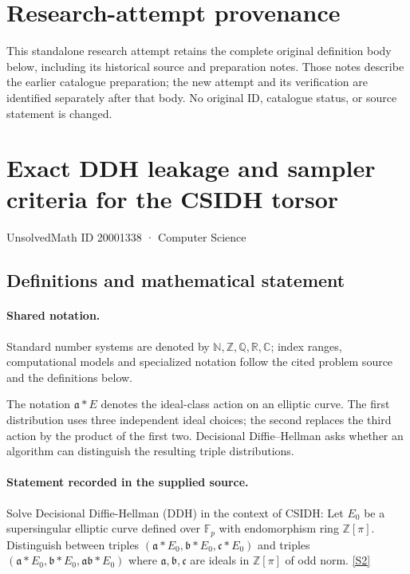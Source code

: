 \documentclass[11pt]{article}
\begin{document}
\section*{Research-attempt provenance}
This standalone research attempt retains the complete original definition body below,
including its historical source and preparation notes. Those notes describe the
earlier catalogue preparation; the new attempt and its verification are identified
separately after that body. No original ID, catalogue status, or source statement is changed.

\section{Exact DDH leakage and sampler criteria for the CSIDH torsor}\label{20001338}
{\small UnsolvedMath ID 20001338 · Computer Science}
\subsection{Definitions and mathematical statement}

\paragraph{Shared notation.}Standard number systems are denoted by $\mathbb N,\mathbb Z,\mathbb Q,\mathbb R,\mathbb C$; index ranges, computational models and specialized notation follow the cited problem source and the definitions below.


The notation $\mathfrak a*E$ denotes the ideal-class action on an elliptic curve. The first distribution uses three independent ideal choices; the second replaces the third action by the product of the first two. Decisional Diffie--Hellman asks whether an algorithm can distinguish the resulting triple distributions.
\paragraph{Statement recorded in the supplied source.}
Solve Decisional Diffie-Hellman (DDH) in the context of CSIDH: Let $E_0$ be a supersingular elliptic curve defined over $\mathbb F_p$ with endomorphism ring $\mathbb Z[\pi]$. Distinguish between triples $(\mathfrak a * E_0, \mathfrak b* E_0,\mathfrak c* E_0)$ and triples $(\mathfrak a * E_0, \mathfrak b* E_0,\mathfrak a\mathfrak b * E_0)$ where $\mathfrak a, \mathfrak b, \mathfrak c$ are ideals in $\mathbb Z[\pi]$ of odd norm. \href{http://aimpl.org/quantumalg/5/}{[S2]}
\end{document}
